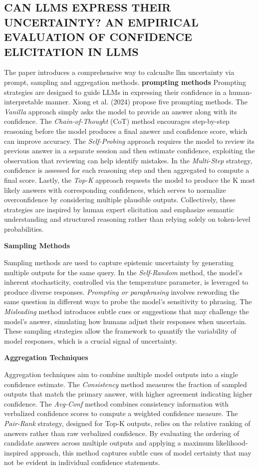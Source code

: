 \subsection{CAN LLMS EXPRESS THEIR UNCERTAINTY?
AN EMPIRICAL EVALUATION OF CONFIDENCE ELICITATION IN LLMS}
The paper introduces a comprehensive way to calcualte llm uncertainty via prompt, sampling and aggregation methods.
\textbf{prompting methods}
Prompting strategies are designed to guide LLMs in expressing their confidence in a human-interpretable manner. Xiong et al. (2024) propose five prompting methods. The \textit{Vanilla} approach simply asks the model to provide an answer along with its confidence. The \textit{Chain-of-Thought} (CoT) method encourages step-by-step reasoning before the model produces a final answer and confidence score, which can improve accuracy. The \textit{Self-Probing} approach requires the model to review its previous answer in a separate session and then estimate confidence, exploiting the observation that reviewing can help identify mistakes. In the \textit{Multi-Step} strategy, confidence is assessed for each reasoning step and then aggregated to compute a final score. Lastly, the \textit{Top-K} approach requests the model to produce the K most likely answers with corresponding confidences, which serves to normalize overconfidence by considering multiple plausible outputs. Collectively, these strategies are inspired by human expert elicitation and emphasize semantic understanding and structured reasoning rather than relying solely on token-level probabilities.

\textbf{Sampling Methods}

Sampling methods are used to capture epistemic uncertainty by generating multiple outputs for the same query. In the \textit{Self-Random} method, the model’s inherent stochasticity, controlled via the temperature parameter, is leveraged to produce diverse responses. \textit{Prompting or paraphrasing} involves rewording the same question in different ways to probe the model’s sensitivity to phrasing. The \textit{Misleading} method introduces subtle cues or suggestions that may challenge the model’s answer, simulating how humans adjust their responses when uncertain. These sampling strategies allow the framework to quantify the variability of model responses, which is a crucial signal of uncertainty.

\textbf{Aggregation Techniques}

Aggregation techniques aim to combine multiple model outputs into a single confidence estimate. The \textit{Consistency} method measures the fraction of sampled outputs that match the primary answer, with higher agreement indicating higher confidence. The \textit{Avg-Conf} method combines consistency information with verbalized confidence scores to compute a weighted confidence measure. The \textit{Pair-Rank} strategy, designed for Top-K outputs, relies on the relative ranking of answers rather than raw verbalized confidence. By evaluating the ordering of candidate answers across multiple outputs and applying a maximum likelihood-inspired approach, this method captures subtle cues of model certainty that may not be evident in individual confidence statements.

